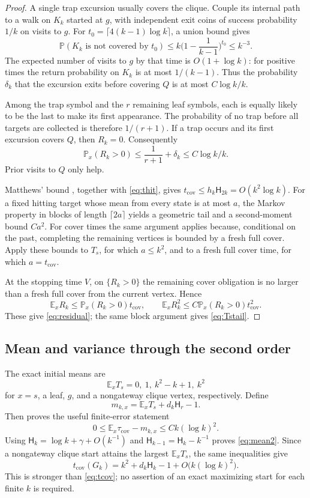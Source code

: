 \documentclass[11pt]{amsart}
\theoremstyle{remark}
\numberwithin{equation}{section}
\newcommand{\E}{\mathbb{E}}
\newcommand{\Prob}{\mathbb{P}}
\newcommand{\tcov}{t_{\mathrm{cov}}}
\newcommand{\taucov}{\tau_{\mathrm{cov}}}
\newcommand{\Harm}{\mathsf{H}}
\begin{document}
\begin{proof}
A single trap excursion usually covers the clique. Couple its internal path to a walk on $K_k$ started at $g$, with independent exit coins of success probability $1/k$ on visits to $g$. For $t_0=\lceil 4(k-1)\log k\rceil$, a union bound gives
\[
\Prob(K_k\text{ is not covered by }t_0)\le k\Big(1-\frac1{k-1}\Big)^{t_0}\le k^{-3}.
\]
The expected number of visits to $g$ by that time is $O(1+\log k)$: for positive times the return probability on $K_k$ is at most $1/(k-1)$. Thus the probability $\delta_k$ that the excursion exits before covering $Q$ is at most $C\log k/k$.

Among the trap symbol and the $r$ remaining leaf symbols, each is equally likely to be the last to make its first appearance. The probability of no trap before all targets are collected is therefore $1/(r+1)$. If a trap occurs and its first excursion covers $Q$, then $R_k=0$. Consequently
\[
\Prob_x(R_k>0)\le\frac1{r+1}+\delta_k\le C\log k/k.
\]
Prior visits to $Q$ only help.

Matthews' bound \cite{Matthews88}, together with \eqref{eq:thit}, gives $\tcov\le h_k\Harm_{2k}=O(k^2\log k)$. For a fixed hitting target whose mean from every state is at most $a$, the Markov property in blocks of length $\lceil 2a\rceil$ yields a geometric tail and a second-moment bound $Ca^2$. For cover times the same argument applies because, conditional on the past, completing the remaining vertices is bounded by a fresh full cover. Apply these bounds to $T_s$, for which $a\le k^2$, and to a fresh full cover time, for which $a=\tcov$.

At the stopping time $V$, on $\{R_k>0\}$ the remaining cover obligation is no larger than a fresh full cover from the current vertex. Hence
\[
\E_xR_k\le\Prob_x(R_k>0)\tcov,\qquad \E_xR_k^2\le C\Prob_x(R_k>0)\tcov^2.
\]
These give \eqref{eq:residual}; the same block argument gives \eqref{eq:Tstail}.
\end{proof}

\subsection{Mean and variance through the second order}
The exact initial means are
\[
\E_xT_s=0,\ 1,\ k^2-k+1,\ k^2
\]
for $x=s$, a leaf, $g$, and a nongateway clique vertex, respectively. Define
\[
m_{k,x}=\E_xT_s+d_k\Harm_r-1.
\]
Then  proves the useful finite-error statement
\begin{equation}\label{eq:bracket}
0\le\E_x\taucov-m_{k,x}\le Ck(\log k)^2.
\end{equation}
Using $\Harm_k=\log k+\gamma+O(k^{-1})$ and $\Harm_{k-1}=\Harm_k-k^{-1}$ proves \eqref{eq:mean2}. Since a nongateway clique start attains the largest $\E_xT_s$, the same inequalities give
\begin{equation}\label{eq:tcovexact}
\tcov(G_k)=k^2+d_k\Harm_k-1+O\big(k(\log k)^2\big).
\end{equation}
This is stronger than \eqref{eq:tcov}; no assertion of an exact maximizing start for each finite $k$ is required.
\end{document}
